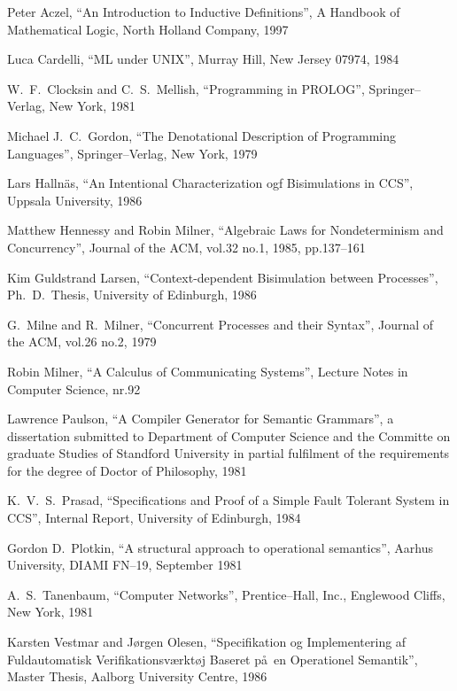 \begin{thebibliography}{Clocksin,Mellish}


 Peter Aczel, ``An Introduction to Inductive Definitions'', A Handbook of Mathematical Logic, North Holland Company, 1997

 Luca Cardelli, ``ML under UNIX'', Murray Hill, New Jersey 07974, 1984

 W.~F.~Clocksin and C.~S.~Mellish, ``Programming in PROLOG'', Springer--Verlag, New York, 1981

 Michael J.~C.~Gordon, ``The Denotational Description of Programming Languages'', Springer--Verlag, New York, 1979

 Lars Halln\"as, ``An Intentional Characterization ogf Bisimulations in CCS'', Uppsala University, 1986

 Matthew Hennessy and Robin Milner, ``Algebraic Laws for Nondeterminism and Concurrency'', Journal of the ACM, vol.32 no.1, 1985, pp.137--161

 Kim Guldstrand Larsen, ``Context-dependent Bisimulation between Processes'', Ph.~D.~Thesis, University of Edinburgh, 1986

 G.~Milne and R.~Milner, ``Concurrent Processes and their Syntax'', Journal of the ACM, vol.26 no.2, 1979

 Robin Milner, ``A Calculus of Communicating Systems'', Lecture Notes in Computer Science, nr.92

 Lawrence Paulson, ``A Compiler Generator for Semantic Grammars'', a dissertation submitted to Department of Computer Science and the Committe on graduate Studies of Standford University in partial fulfilment of the requirements for the degree of Doctor of Philosophy, 1981

 K.~V.~S.~Prasad, ``Specifications and Proof of a Simple Fault Tolerant System in CCS'', Internal Report, University of Edinburgh, 1984

 Gordon D.~Plotkin, ``A structural approach to operational semantics'', Aarhus University, DIAMI FN--19, September 1981

 A.~S.~Tanenbaum, ``Computer Networks'', Prentice--Hall, Inc., Englewood Cliffs, New York, 1981

 Karsten Vestmar and J\o rgen Olesen, ``Specifikation og Implementering af Fuldautomatisk Verifikationsv\ae rkt\o j Baseret p\aa\ en Operationel Semantik'', Master Thesis, Aalborg University Centre, 1986



\end{thebibliography}


